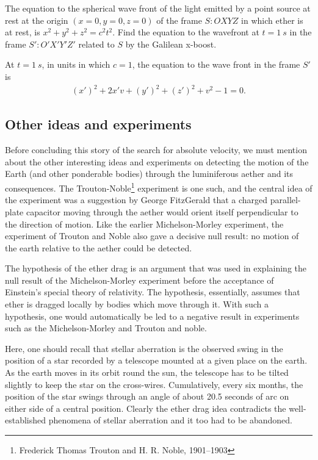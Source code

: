 \exm The equation to the spherical wave front of the light 
emitted by a point source at rest at the origin 
$(x=0,y=0,z=0)$ of the frame  $S:OXYZ $ in which ether is at 
rest, is  $ x^2+y^2+z^2 =c^2 t^2$. Find the equation to the 
wavefront at $t=\SI{1}{s}$ in the frame $S':O'X'Y'Z'$ 
related to $S$ by the Galilean x-boost.

\soln At $t=\SI{1}{s}$,  in units in which $c=1 $, the 
equation to the wave front in the frame $S'$ is
\begin{align}
(x')^2+2x'v+ (y')^2+(z')^2+v^2 -1=0.
\end{align} \ebx

\vspace{-.2cm}

\subsection{Other ideas and experiments} 
Before concluding this story of the search for absolute 
velocity, we must mention about the other interesting ideas 
and experiments on detecting the motion of the Earth (and 
other ponderable bodies) through the luminiferous aether and 
its consequences. The Trouton-Noble\footnote{Frederick 
Thomas Trouton and H. R. Noble, 1901–1903} experiment is one 
such, and the central idea of the experiment was a 
suggestion by George FitzGerald that a charged 
parallel-plate capacitor moving through the aether would 
orient itself perpendicular to the direction of motion. Like 
the earlier Michelson-Morley experiment, the experiment of  
Trouton and Noble also gave a decisive null result: no 
motion of the earth relative to the aether could be 
detected.

The hypothesis of the ether drag is an argument that was 
used in explaining the null result of the Michelson-Morley 
experiment before the acceptance of Einstein's special 
theory of relativity. The hypothesis,  essentially, assumes 
that ether is dragged locally by bodies which move through 
it. With such a hypothesis, one would automatically be led 
to a negative result in experiments such as the 
Michelson-Morley and Trouton and noble. 

Here, one should recall that stellar aberration is 
the observed swing in the position of a star recorded by a 
telescope mounted at a given place on the earth. As the 
earth moves in its orbit round the sun, the telescope has to 
be tilted slightly to keep the star on the cross-wires. 
Cumulatively, every six months, the position of the star 
swings through an angle of about 20.5 seconds of arc on 
either side of a central position. Clearly the ether drag  
idea contradicts the well-established phenomena of stellar 
aberration and it too had to be abandoned.
\enlargethispage*{3\bsk}

